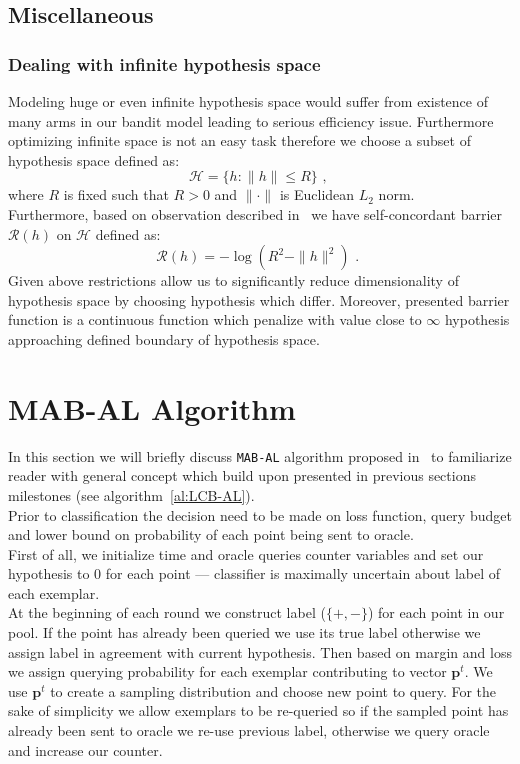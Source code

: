 \documentclass[12pt, a4paper, pdflatex]{report}
\begin{document}
\subsection{Miscellaneous}
\subsubsection{Dealing with infinite hypothesis space}
Modeling huge or even infinite hypothesis space would suffer from existence of many arms in our bandit model leading to serious efficiency issue. Furthermore optimizing infinite space is not an easy task therefore we choose a subset of hypothesis space defined as:
$$
\mathscr{H} = \{ h : \|h\| \leq R \} \text{~,~}
$$
where $R$ is fixed such that $R > 0$ and $\| \cdot \|$ is Euclidean $L_2$ norm.\\
Furthermore, based on observation described in~\cite{Abernethy08competingin} we have self-concordant barrier $\mathscr{R}(h)$ on $\mathscr{H}$ defined as:
$$
\mathscr{R}(h) = - \log(R^2 - \|h\|^2) \text{~.~}
$$
Given above restrictions allow us to significantly reduce dimensionality of hypothesis space by choosing hypothesis which differ. Moreover, presented barrier function is a continuous function which penalize with value close to $\infty$ hypothesis approaching defined boundary of hypothesis space.\\


\section{MAB-AL Algorithm}

In this section we will briefly discuss \texttt{MAB-AL} algorithm proposed in~\cite{DBLP:journals/corr/GantiG13} to familiarize reader with general concept which build upon presented in previous sections milestones (see algorithm~\ref{al:LCB-AL}). \\Prior to classification the decision need to be made on loss function, query budget and lower bound on probability of each point being sent to oracle.\\

First of all, we initialize time and oracle queries counter variables and set our hypothesis to $0$ for each point --- classifier is maximally uncertain about label of each exemplar.\\

At the beginning of each round we construct label ($\{+, -\}$) for each point in our pool. If the point has already been queried we use its true label otherwise we assign label in agreement with current hypothesis. Then based on margin and loss we assign querying probability for each exemplar contributing to vector $\mathbf{p}^t$. We use $\mathbf{p}^t$ to create a sampling distribution and choose new point to query. For the sake of simplicity we allow exemplars to be re-queried so if the sampled point has already been sent to oracle we re-use previous label, otherwise we query oracle and increase our counter.\\
\end{document}
